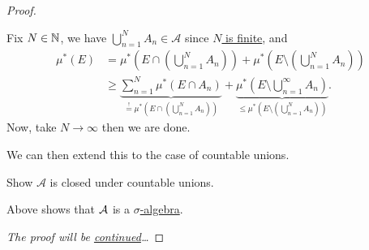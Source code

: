 \begin{proof}
\begin{enumerate}[(1)]
\begin{itemize}
\begin{explanation}
				            Fix \(N\in\mathbb{\MakeUppercase{N}} \), we have \(\bigcup\limits_{n=1}^{N} A_{n}\in \mathcal{A} \) since \hyperref[pf:Caratheodory-extension-Thm-1-finite-unions]{\(N\) is finite}, and
				            \[
					            \begin{split}
						            \mu^{\ast} (E) &= \mu^{\ast} \left(E\cap \left(\bigcup\limits_{n=1}^{N} A_{n}\right)\right) + \mu^{\ast} \left(E\setminus \left(\bigcup\limits_{n=1}^{N} A_{n}\right)\right)\\
						            &\geq \underbrace{\sum\limits_{n=1}^{N} \mu^{\ast} (E\cap A_{n})}_{ \overset{\hyperref[lma:disjoint-C-measurable-finite-additive]{!}}{=} \mu^{\ast} \left(E\cap \left(\bigcup\limits_{n=1}^{N} A_{n}\right)\right)} + \underbrace{\mu^{\ast} \left(E\setminus \bigcup\limits_{n=1}^{\infty} A_{n}\right)}_{\leq \mu^{\ast} \left(E\setminus \left(\bigcup\limits_{n=1}^{N} A_{n}\right)\right)}.
					            \end{split}
				            \]
				            Now, take \(N\to \infty \) then we are done.
			            \end{explanation}
			            We can then extend this to the case of countable unions.
			            \begin{exercise}
				            Show \(\mathcal{A} \) is closed under countable unions.
			            \end{exercise}
			            \begin{answer}
			            \end{answer}
		      \end{itemize}
		      Above shows that \(\mathcal{\MakeUppercase{a}} \) is a \hyperref[def:sigma-algebra]{\(\sigma\)-algebra}.
	\end{enumerate}
	\emph{The proof will be \hyperref[pf:Caratheodory-extension-Thm-cont]{continued}\ldots}
\end{proof}